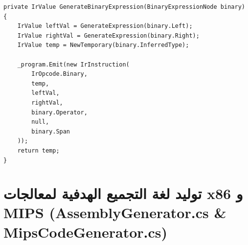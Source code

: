 \documentclass[12pt,a4paper]{report}
\begin{document}
\begin{lstlisting}[language={[Sharp]C}, caption={مقتطف حقيقي من توليد اوامر الشفرة الوسيطة IrGenerator.cs}]
private IrValue GenerateBinaryExpression(BinaryExpressionNode binary)
{
    IrValue leftVal = GenerateExpression(binary.Left);
    IrValue rightVal = GenerateExpression(binary.Right);
    IrValue temp = NewTemporary(binary.InferredType);

    _program.Emit(new IrInstruction(
        IrOpcode.Binary,
        temp,
        leftVal,
        rightVal,
        binary.Operator,
        null,
        binary.Span
    ));
    return temp;
}
\end{lstlisting}

\newpage

\section{توليد لغة التجميع الهدفية لمعالجات x86 و MIPS (AssemblyGenerator.cs \& MipsCodeGenerator.cs)}
\end{document}
